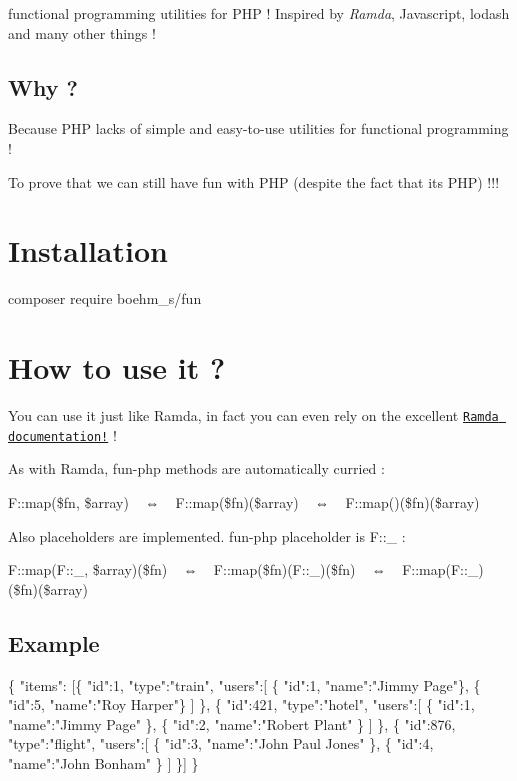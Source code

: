 functional programming utilities for P\+HP ! Inspired by {\itshape Ramda}, Javascript, lodash and many other things !

\subsection*{Why ?}


\begin{DoxyItemize}
\item Because P\+HP lacks of simple and easy-\/to-\/use utilities for functional programming !
\item To prove that we can still have fun with P\+HP (despite the fact that it\textquotesingle{}s P\+HP) !!!
\end{DoxyItemize}

\section*{Installation}


\begin{DoxyCode}
composer require boehm\_s/fun
\end{DoxyCode}


\section*{How to use it ?}

You can use it just like Ramda, in fact you can even rely on the excellent \href{https://ramdajs.com/docs/}{\tt Ramda documentation!} !

As with Ramda, fun-\/php methods are automatically curried \+:

{\ttfamily F\+::map(\$fn, \$array)} ~ ⇔ ~ {\ttfamily F\+::map(\$fn)(\$array)} ~ ⇔ ~ {\ttfamily F\+::map()(\$fn)(\$array)}

Also placeholders are implemented. fun-\/php placeholder is {\ttfamily F\+::\+\_\+} \+:

{\ttfamily F\+::map(F\+::\+\_\+, \$array)(\$fn)} ~ ⇔ ~ {\ttfamily F\+::map(\$fn)(F\+::\+\_\+)(\$fn)} ~ ⇔ ~ {\ttfamily F\+::map(\+F\+::\+\_\+)(\$fn)(\$array)}

\subsection*{Example}


\begin{DoxyCode}
\{
  "items": [\{
      "id":1,
      "type":"train",
      "users":[
        \{ "id":1, "name":"Jimmy Page"\},
        \{ "id":5, "name":"Roy Harper"\}
      ]
    \}, \{
      "id":421,
      "type":"hotel",
      "users":[
        \{ "id":1, "name":"Jimmy Page" \}, 
        \{ "id":2, "name":"Robert Plant" \}
      ]
    \}, \{
      "id":876,
      "type":"flight",
      "users":[
        \{ "id":3, "name":"John Paul Jones" \},
        \{ "id":4, "name":"John Bonham" \}
      ]
    \}]
\}
\end{DoxyCode}


